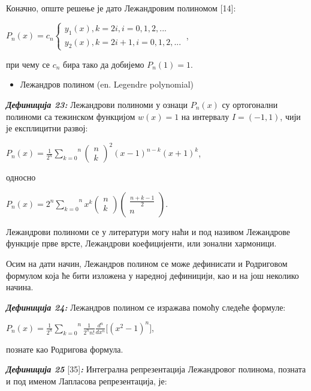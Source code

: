 Коначно, опште решење је дато Лежандровим полиномом {[}14{]}:

\(P_{n}(x) = c_{n}\left\{ \begin{array}{r}
y_{1}(x),k = 2i,i = 0,1,2,... \\
y_{2}(x),k = 2i + 1,i = 0,1,2,...
\end{array} \right.\ \),

при чему се \(c_{n}\) бира тако да добијемо \(P_{n}(1) = 1\).

\begin{itemize}
\item
  Лежандров полином (en. Legendre polynomial)
\end{itemize}

\emph{\textbf{Дефиниција 23:}} Лежандрови полиноми у ознаци \(P_{n}(x)\)
су ортогонални полиноми са тежинском функцијом \(w(x) = 1\) на интервалу
\(I = ( - 1,1)\), чији је експлицитни развој:

\(P_{n}(x) = \frac{1}{2^{n}}\overset{n}{\sum_{k = 0}}\left( \begin{array}{r}
n \\
k
\end{array} \right)^{2}{(x - 1)}^{n - k}{(x + 1)}^{k}\),

односно

\(P_{n}(x) = 2^{n}\overset{n}{\sum_{k = 0}}x^{k}\left( \begin{array}{r}
n \\
k
\end{array} \right)\left( \begin{array}{r}
\frac{n + k - 1}{2} \\
n
\end{array} \right)\).

Лежандрови полиноми се у литератури могу наћи и под називом Лежандрове
функције прве врсте, Лежандрови коефицијенти, или зонални хармоници.

Осим на дати начин, Лежандров полином се може дефинисати и Родриговом
формулом која ће бити изложена у наредној дефиницији, као и на још
неколико начина.

\emph{\textbf{Дефиниција 24:}} Лежандров полином се изражава помоћу
следеће формуле:

\(P_{n}(x) = \frac{1}{2^{n}}\overset{n}{\sum_{k = 0}}\frac{1}{2^{n}n!}\frac{d^{n}}{dx^{n}}\lbrack{(x^{2} - 1)}^{n}\rbrack\),

познате као Родригова формула.

\emph{\textbf{Дефиниција 25}} {[}35{]}\emph{\textbf{:}} Интегрална
репрезентација Лежандровог полинома, позната и под именом Лапласова
репрезентација, је:

